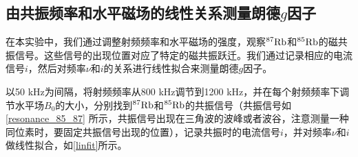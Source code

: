\documentclass[font=default]{mpltx}
\begin{document}
\subsection{由共振频率和水平磁场的线性关系测量朗德$g$因子}
在本实验中，我们通过调整射频频率和水平磁场的强度，观察${\rm ^{87}Rb}$和${\rm ^{85}Rb}$的磁共振信号。这些信号的出现位置对应了特定的磁共振跃迁。我们通过记录相应的电流信号$i$，然后对频率$\nu$和$i$的关系进行线性拟合来测量朗德$g$因子。

以50 kHz为间隔，将射频频率从800 kHz调节到1200 kHz，并在每个射频频率下调节水平场$B_0$的大小，分别找到${\rm ^{87}Rb}$和${\rm ^{85}Rb}$的共振信号（共振信号如\autoref{resonance_85_87} 所示，共振信号出现在三角波的波峰或者波谷，注意测量一种同位素时，要固定共振信号出现的位置），记录共振时的电流信号$i$，并对频率$\nu$和$i$做线性拟合，如\autoref{linfit}所示。
\end{document}
